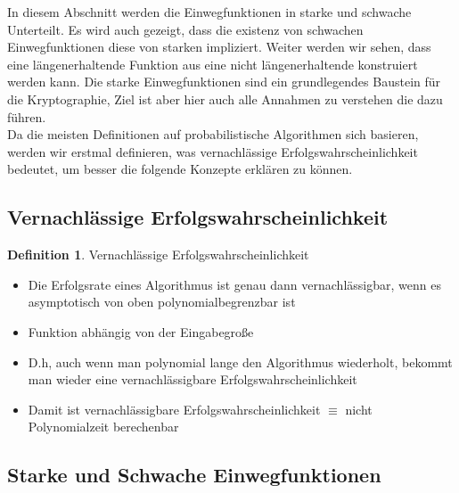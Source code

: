 \documentclass[12pt,a4paper]{article}
\theoremstyle{definition}
\newtheorem{definition}[theorem]{Definition}
\begin{document}
    In diesem Abschnitt werden die Einwegfunktionen in starke und schwache Unterteilt. Es wird auch gezeigt, dass die
    existenz von schwachen Einwegfunktionen diese von starken impliziert. Weiter werden wir sehen, dass eine
    längenerhaltende Funktion aus eine nicht längenerhaltende konstruiert werden kann. Die starke Einwegfunktionen
    sind ein grundlegendes Baustein für die Kryptographie, Ziel ist aber hier auch alle Annahmen zu verstehen die dazu
    führen. \\
    Da die meisten Definitionen auf probabilistische Algorithmen sich basieren, werden wir erstmal definieren, was
    vernachlässige Erfolgswahrscheinlichkeit bedeutet, um besser die folgende Konzepte erklären zu können.

    \subsection{Vernachlässige Erfolgswahrscheinlichkeit}

    \begin{definition}
        Vernachlässige Erfolgswahrscheinlichkeit
        \begin{itemize}
            \item Die Erfolgsrate eines Algorithmus ist genau dann vernachlässigbar, wenn es asymptotisch von oben
                polynomialbegrenzbar ist
            \item Funktion abhängig von der Eingabegroße
            \item D.h, auch wenn man polynomial lange den Algorithmus wiederholt, bekommt man wieder eine
                vernachlässigbare Erfolgswahrscheinlichkeit
            \item Damit ist vernachlässigbare Erfolgswahrscheinlichkeit $\equiv$ nicht Polynomialzeit berechenbar
        \end{itemize}
    \end{definition}

    \subsection{Starke und Schwache Einwegfunktionen}
\end{document}
